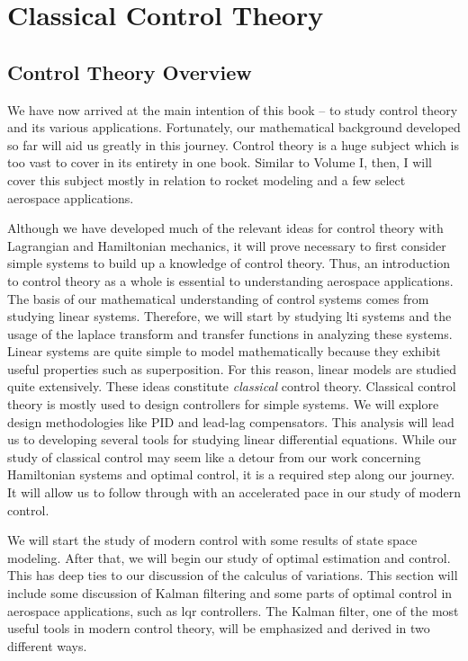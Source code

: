 \part{Classical Control Theory}\label{part:control theory}



\chapter*{Control Theory Overview}

We have now arrived at the main intention of this book -- to study control theory and its various applications. Fortunately, our mathematical background developed so far will aid us greatly in this journey. Control theory is a huge subject which is too vast to cover in its entirety in one book. Similar to Volume I, then, I will cover this subject mostly in relation to rocket modeling and a few select aerospace applications.

Although we have developed much of the relevant ideas for control theory with \gls{Lagrangian} and \gls{Hamiltonian} mechanics, it will prove necessary to first consider simple systems to build up a knowledge of control theory. Thus, an introduction to control theory as a whole is essential to understanding aerospace applications. The basis of our mathematical understanding of control systems comes from studying linear systems. Therefore, we will start by studying \gls{lti} systems and the usage of the \gls{laplace transform} and transfer functions in analyzing these systems. Linear systems are quite simple to model mathematically because they exhibit useful properties such as superposition. For this reason, linear models are studied quite extensively. These ideas constitute \textit{classical} control theory. Classical control theory is mostly used to design controllers for simple systems. We will explore design methodologies like PID and lead-lag compensators. This analysis will lead us to developing several tools for studying linear differential equations. While our study of classical control may seem like a detour from our work concerning Hamiltonian systems and optimal control, it is a required step along our journey. It will allow us to follow through with an accelerated pace in our study of modern control.

We will start the study of modern control with some results of state space modeling. After that, we will begin our study of optimal estimation and control. This has deep ties to our discussion of the calculus of variations. This section will include some discussion of Kalman filtering and some parts of optimal control in aerospace applications, such as \gls{lqr} controllers. The Kalman filter, one of the most useful tools in modern control theory, will be emphasized and derived in two different ways.

